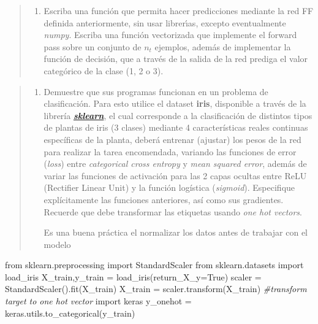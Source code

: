 \documentclass[11pt]{article}
\providecommand{\tightlist}{%
      \setlength{\itemsep}{0pt}\setlength{\parskip}{0pt}}
\newenvironment{Shaded}{}{}
\newcommand{\CommentTok}[1]{\textcolor[rgb]{0.38,0.63,0.69}{\textit{{#1}}}}
\newcommand{\NormalTok}[1]{{#1}}
\newcommand{\ImportTok}[1]{{#1}}
\newcommand{\VariableTok}[1]{\textcolor[rgb]{0.10,0.09,0.49}{{#1}}}
\newcommand{\OperatorTok}[1]{\textcolor[rgb]{0.40,0.40,0.40}{{#1}}}
\begin{document}
\begin{quote}
\begin{enumerate}
\def\labelenumi{\alph{enumi})}
\setcounter{enumi}{1}
\tightlist
\item
  Escriba una función que permita hacer predicciones mediante la red FF
  definida anteriormente, sin usar librerı́as, excepto eventualmente
  \emph{numpy}. Escriba una función vectorizada que implemente el
  forward pass sobre un conjunto de \(n_{t}\) ejemplos, además de
  implementar la función de decisión, que a través de la salida de la
  red prediga el valor categórico de la clase (1, 2 o 3).
\end{enumerate}
\end{quote}

\begin{quote}
\begin{enumerate}
\def\labelenumi{\alph{enumi})}
\setcounter{enumi}{2}
\tightlist
\item
  Demuestre que sus programas funcionan en un problema de clasificación.
  Para esto utilice el dataset \textbf{iris}, disponible a través de la
  librería \textbf{\href{http://scikit-learn.org}{\emph{sklearn}}}, el
  cual corresponde a la clasificación de distintos tipos de plantas de
  iris (3 clases) mediante 4 características reales continuas
  específicas de la planta, deberá entrenar (ajustar) los pesos de la
  red para realizar la tarea encomendada, variando las funciones de
  error (\emph{loss}) entre \emph{categorical cross entropy} y
  \emph{mean squared error}, además de variar las funciones de
  activación para las 2 capas ocultas entre ReLU (Rectifier Linear Unit)
  y la función logística (\emph{sigmoid}). Especifique explícitamente
  las funciones anteriores, así como sus gradientes. Recuerde que debe
  transformar las etiquetas usando \emph{one hot vectors}.

  Es una buena práctica el normalizar los datos antes de trabajar con el
  modelo
\end{enumerate}
\end{quote}

\begin{Shaded}
\begin{Highlighting}[]
\ImportTok{from}\NormalTok{ sklearn.preprocessing }\ImportTok{import}\NormalTok{ StandardScaler}
\ImportTok{from}\NormalTok{ sklearn.datasets }\ImportTok{import}\NormalTok{ load_iris}
\NormalTok{X_train,y_train }\OperatorTok{=}\NormalTok{ load_iris(return_X_y}\OperatorTok{=}\VariableTok{True}\NormalTok{)}
\NormalTok{scaler }\OperatorTok{=}\NormalTok{ StandardScaler().fit(X_train)}
\NormalTok{X_train }\OperatorTok{=}\NormalTok{ scaler.transform(X_train)}
\CommentTok{#transform target to one hot vector}
\ImportTok{import}\NormalTok{ keras}
\NormalTok{y_onehot }\OperatorTok{=}\NormalTok{ keras.utils.to_categorical(y_train)}
\end{Highlighting}
\end{Shaded}
\end{document}
